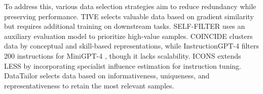 \noindent To address this, various data selection strategies aim to reduce redundancy while preserving performance. TIVE \citep{liu2024morehighvaluedataselection} selects valuable data based on gradient similarity but requires additional training on downstream tasks. SELF-FILTER \citep{chen2024visionlanguagemodelstrongfilter} uses an auxiliary evaluation model to prioritize high-value samples. COINCIDE \citep{lee2024conceptskilltransferabilitybaseddataselection} clusters data by conceptual and skill-based representations, while InstructionGPT-4 \citep{wei2023instructiongpt4200instructionparadigmfinetuning} filters 200 instructions for MiniGPT-4 \citep{zhu2023minigpt4enhancingvisionlanguageunderstanding}, though it lacks scalability. ICONS \citep{wu2025iconsinfluenceconsensusvisionlanguage} extends LESS \citep{xia2024lessselectinginfluentialdata} by incorporating specialist influence estimation for instruction tuning. DataTailor \citep{yu2024mastering} selects data based on informativeness, uniqueness, and representativeness to retain the most relevant samples.